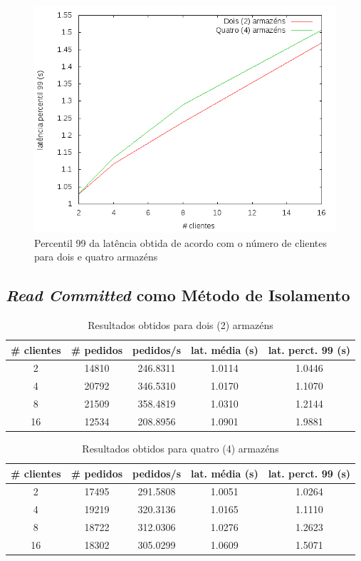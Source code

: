 \begin{figure}[!h]
\centering
\includegraphics[scale=.5]{img/questao-1/read-uncom-lat-pct99}
\caption{Percentil 99 da latência obtida de acordo com o número de clientes para dois e quatro armazéns}
\end{figure}

\subsection{\textit{Read Committed} como Método de Isolamento}

\begin{table}[!h]
\center
\small
\begin{tabular}{|c|c|c|c|c|}
\hline
\textbf{\# clientes} & \textbf{\# pedidos} & \textbf{pedidos/s} & \textbf{lat. média (s)} & \textbf{lat. perct. 99 (s)}  \\ \hline
2 & 14810 & 246.8311 & 1.0114 & 1.0446  \\ \hline
4 & 20792 & 346.5310 & 1.0170 & 1.1070  \\ \hline
8 & 21509 & 358.4819 & 1.0310 & 1.2144  \\ \hline
16 & 12534 & 208.8956 & 1.0901 & 1.9881  \\ \hline
\end{tabular}
\caption{Resultados obtidos para dois (2) armazéns}
\end{table}

\begin{table}[!h]
\center
\small
\begin{tabular}{|c|c|c|c|c|}
\hline
\textbf{\# clientes} & \textbf{\# pedidos} & \textbf{pedidos/s} & \textbf{lat. média (s)} & \textbf{lat. perct. 99 (s)}  \\ \hline
2 & 17495 & 291.5808 & 1.0051 & 1.0264  \\ \hline
4 & 19219 & 320.3136 & 1.0165 & 1.1110  \\ \hline
8 & 18722 & 312.0306 & 1.0276 & 1.2623  \\ \hline
16 & 18302 & 305.0299 & 1.0609 & 1.5071  \\ \hline
\end{tabular}
\caption{Resultados obtidos para quatro (4) armazéns}
\end{table}

